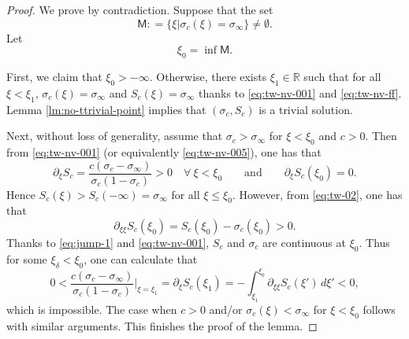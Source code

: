 \documentclass[10pt,a4paper]{amsart}
\begin{document}
\begin{proof}
    We prove by contradiction. Suppose that the set 
    \begin{equation}
        \label{001-tw-nv}
        \mathsf M: = \lbrace \xi \vert \sigma_c(\xi) = \sigma_\infty \rbrace \neq \emptyset. 
    \end{equation}
    Let 
    \begin{equation}
        \label{002-tw-nv}
        \xi_0 = \inf \mathsf M. 
    \end{equation}
    
    First, we claim that $ \xi_0 > -\infty $. Otherwise, there exists $ \xi_1 \in \mathbb R $ such that for all $ \xi < \xi_1 $,  $ \sigma_c (\xi) = \sigma_\infty $ and $ S_c (\xi) = \sigma_\infty $ thanks to \eqref{eq:tw-nv-001} and \eqref{eq:tw-nv-ff}. Lemma \ref{lm:no-ttrivial-point} implies that $ (\sigma_c,S_c) $ is a trivial solution. 
    
    Next, without loss of generality, assume that $ \sigma_c > \sigma_\infty $ for $ \xi < \xi_0 $ and $ c > 0 $. Then from \eqref{eq:tw-nv-001} (or equivalently \eqref{eq:tw-nv-005}), one has that
    \begin{equation}
        \label{003-tw-nv}
        \partial_\xi S_c = \frac{c (\sigma_c - \sigma_\infty)}{\sigma_c (1-\sigma_c)} > 0 \quad \forall \ \xi < \xi_0 \qquad \text{and} \qquad  \partial_\xi S_c(\xi_0) = 0.
    \end{equation}
    Hence $ S_c(\xi) > S_c(-\infty) = \sigma_\infty $ for all $ \xi \leq  \xi_0 $. However, from \eqref{eq:tw-02}, one has that
    \begin{equation}
    \label{004-tw-nv}
        \partial_{\xi\xi} S_c (\xi_0) = S_c(\xi_0) - \sigma_c(\xi_0) > 0.
    \end{equation}
    Thanks to \eqref{eq:jump-1} and \eqref{eq:tw-nv-001}, $ S_c $ and $ \sigma_c $ are continuous at $ \xi_0 $. Thus for some $ \xi_\delta < \xi_0 $, one can calculate that
    \begin{equation}
         0 < \frac{c (\sigma_c - \sigma_\infty)}{\sigma_c (1-\sigma_c)}\Big\vert_{\xi = \xi_1} = \partial_\xi S_c(\xi_1) = - \int_{\xi_1}^{\xi_0} \partial_{\xi\xi} S_c(\xi') \, d\xi' < 0,
    \end{equation}
    which is impossible.
    The case when $ c > 0 $ and/or $ \sigma_c(\xi) < \sigma_\infty $ for $\xi< \xi_0 $ follows with similar arguments. 
    This finishes the proof of the lemma. 
\end{proof}
\end{document}
